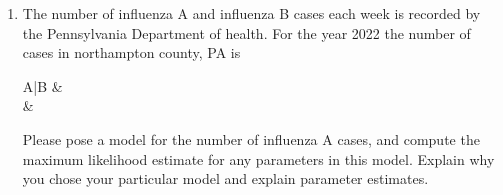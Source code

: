 \begin{enumerate}
    \item The number of influenza A and influenza B cases each week is recorded by the Pennsylvania Department of health. 
    For the year 2022 the number of cases in northampton county, PA is 
    \begin{table}[]
        \centering
        \begin{tabular}{A|B}
             &  \\
             & 
        \end{tabular}
        \caption{Caption}
        \label{tab:my_label}
    \end{table}
    Please pose a model for the number of influenza A cases, and compute the maximum likelihood estimate for any parameters in this model. Explain why you chose your particular model and explain parameter estimates.
    
    
\end{enumerate}




